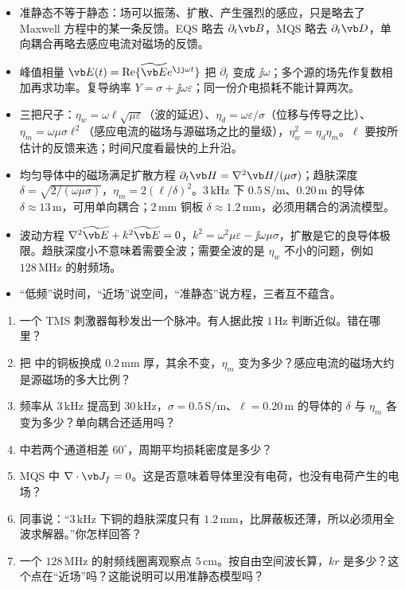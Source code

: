 \begin{takeaways}
\begin{itemize}
\item 准静态不等于静态：场可以振荡、扩散、产生强烈的感应，只是略去了 Maxwell 方程中的某一条反馈。EQS 略去 $\partial_t\vb B$，MQS 略去 $\partial_t\vb D$，单向耦合再略去感应电流对磁场的反馈。
\item 峰值相量 $\vb E(t)=\operatorname{Re}\{\widetilde{\vb E}e^{\jj\omega t}\}$ 把 $\partial_t$ 变成 $\jj\omega$；多个源的场先作复数相加再求功率。复导纳率 $Y=\sigma+\jj\omega\varepsilon$；同一份介电损耗不能计算两次。
\item 三把尺子：$\eta_w=\omega\ell\sqrt{\mu\varepsilon}$（波的延迟）、$\eta_d=\omega\varepsilon/\sigma$（位移与传导之比）、$\eta_m=\omega\mu\sigma\ell^2$（感应电流的磁场与源磁场之比的量级），$\eta_w^2=\eta_d\eta_m$。$\ell$ 要按所估计的反馈来选；时间尺度看最快的上升沿。
\item 均匀导体中的磁场满足扩散方程 $\partial_t\vb H=\nabla^2\vb H/(\mu\sigma)$；趋肤深度 $\delta=\sqrt{2/(\omega\mu\sigma)}$，$\eta_m=2(\ell/\delta)^2$。$3\,\mathrm{kHz}$ 下 $0.5\,\mathrm{S/m}$、$0.20\,\mathrm m$ 的导体 $\delta\approx13\,\mathrm m$，可用单向耦合；$2\,\mathrm{mm}$ 铜板 $\delta\approx1.2\,\mathrm{mm}$，必须用耦合的涡流模型。
\item 波动方程 $\nabla^2\widetilde{\vb E}+k^2\widetilde{\vb E}=0$，$k^2=\omega^2\mu\varepsilon-\jj\omega\mu\sigma$，扩散是它的良导体极限。趋肤深度小不意味着需要全波；需要全波的是 $\eta_w$ 不小的问题，例如 $128\,\mathrm{MHz}$ 的射频场。
\item “低频”说时间，“近场”说空间，“准静态”说方程，三者互不蕴含。
\end{itemize}
\end{takeaways}

\begin{selfcheck}
\begin{enumerate}
\item 一个 TMS 刺激器每秒发出一个脉冲。有人据此按 $1\,\mathrm{Hz}$ 判断近似。错在哪里？
\item 把 中的铜板换成 $0.2\,\mathrm{mm}$ 厚，其余不变，$\eta_m$ 变为多少？感应电流的磁场大约是源磁场的多大比例？
\item 频率从 $3\,\mathrm{kHz}$ 提高到 $30\,\mathrm{kHz}$，$\sigma=0.5\,\mathrm{S/m}$、$\ell=0.20\,\mathrm m$ 的导体的 $\delta$ 与 $\eta_m$ 各变为多少？单向耦合还适用吗？
\item {} 中若两个通道相差 $60^\circ$，周期平均损耗密度是多少？
\item MQS 中 $\nabla\cdot\vb J_f=0$。这是否意味着导体里没有电荷，也没有电荷产生的电场？
\item 同事说：“$3\,\mathrm{kHz}$ 下铜的趋肤深度只有 $1.2\,\mathrm{mm}$，比屏蔽板还薄，所以必须用全波求解器。”你怎样回答？
\item 一个 $128\,\mathrm{MHz}$ 的射频线圈离观察点 $5\,\mathrm{cm}$。按自由空间波长算，$kr$ 是多少？这个点在“近场”吗？这能说明可以用准静态模型吗？
\end{enumerate}
\end{selfcheck}

